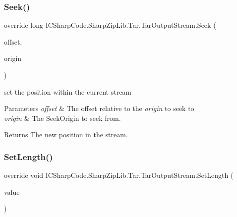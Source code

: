 \subsubsection{\texorpdfstring{Seek()}{Seek()}}
{\footnotesize\ttfamily override long I\+C\+Sharp\+Code.\+Sharp\+Zip\+Lib.\+Tar.\+Tar\+Output\+Stream.\+Seek (\begin{DoxyParamCaption}\item[{long}]{offset,  }\item[{Seek\+Origin}]{origin }\end{DoxyParamCaption})\hspace{0.3cm}{\ttfamily [inline]}}



set the position within the current stream 


\begin{DoxyParams}{Parameters}
{\em offset} & The offset relative to the {\itshape origin}  to seek to\\
\hline
{\em origin} & The Seek\+Origin to seek from.\\
\hline
\end{DoxyParams}
\begin{DoxyReturn}{Returns}
The new position in the stream.
\end{DoxyReturn}
\mbox{\label{class_i_c_sharp_code_1_1_sharp_zip_lib_1_1_tar_1_1_tar_output_stream_adc151653b44969093b2cfb6fd4cd6048}} 
\subsubsection{\texorpdfstring{Set\+Length()}{SetLength()}}
{\footnotesize\ttfamily override void I\+C\+Sharp\+Code.\+Sharp\+Zip\+Lib.\+Tar.\+Tar\+Output\+Stream.\+Set\+Length (\begin{DoxyParamCaption}\item[{long}]{value }\end{DoxyParamCaption})\hspace{0.3cm}{\ttfamily [inline]}}



